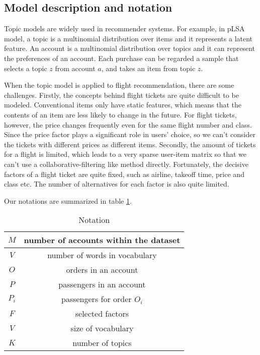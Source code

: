 \documentclass{llncs}
\begin{document}
\subsection{Model description and notation}
Topic models are widely used in recommender systems. For example, in pLSA model\cite{tomas:coll}, a topic is a multinomial distribution over items and it represents a latent feature. An account is a multinomial distribution over topics and it can represent the preferences of an account. Each purchase can be regarded a sample that selects a topic $z$ from account $a$, and takes an item from topic $z$.\par
When the topic model is applied to flight recommendation, there are some challenges. Firstly, the concepts behind flight tickets are quite difficult to be modeled. Conventional items only have static features, which means that the contents of an item are less likely to change in the future. For flight tickets, however, the price changes frequently even for the same flight number and class. Since the price factor plays a significant role in users' choice, so we can't consider the tickets with different prices as different items. Secondly, the amount of tickets for a flight is limited, which leads to a very sparse user-item matrix so that we can't use a collaborative-filtering like method directly. Fortunately, the decisive factors of a flight ticket are quite fixed, such as airline, takeoff time, price and class etc. The number of alternatives for each factor is also quite limited.\par
Our notations are summarized in table \ref{tab:not}.\par
\begin{table}[!htbp]
\centering
\caption{\label{tab:not}Notation}
\begin{tabular}{|c|c|} \hline
$M$ & number of accounts within the dataset\\ \hline
$V$ & number of words in vocabulary\\ \hline
$O$ & orders in an account\\ \hline
$P$ & passengers in an account\\ \hline
$P_i$ & passengers for order $O_i$ \\ \hline
$F$ & selected factors\\ \hline
$V$ & size of vocabulary\\ \hline
$K$ & number of topics\\ \hline
\end{tabular}
\end{table}
\end{document}
